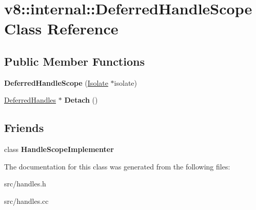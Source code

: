 \hypertarget{classv8_1_1internal_1_1_deferred_handle_scope}{}\section{v8\+:\+:internal\+:\+:Deferred\+Handle\+Scope Class Reference}
\label{classv8_1_1internal_1_1_deferred_handle_scope}
\subsection*{Public Member Functions}
\begin{DoxyCompactItemize}
\item 
\hypertarget{classv8_1_1internal_1_1_deferred_handle_scope_a2a9abeb6fc8fa52bedb8a4de7d8d502a}{}{\bfseries Deferred\+Handle\+Scope} (\hyperlink{classv8_1_1internal_1_1_isolate}{Isolate} $\ast$isolate)\label{classv8_1_1internal_1_1_deferred_handle_scope_a2a9abeb6fc8fa52bedb8a4de7d8d502a}

\item 
\hypertarget{classv8_1_1internal_1_1_deferred_handle_scope_a5aa6f8468dd39ead6bc36caec86db65f}{}\hyperlink{classv8_1_1internal_1_1_deferred_handles}{Deferred\+Handles} $\ast$ {\bfseries Detach} ()\label{classv8_1_1internal_1_1_deferred_handle_scope_a5aa6f8468dd39ead6bc36caec86db65f}

\end{DoxyCompactItemize}
\subsection*{Friends}
\begin{DoxyCompactItemize}
\item 
\hypertarget{classv8_1_1internal_1_1_deferred_handle_scope_a4212b6d1addb496cb92d67a2e399a1f3}{}class {\bfseries Handle\+Scope\+Implementer}\label{classv8_1_1internal_1_1_deferred_handle_scope_a4212b6d1addb496cb92d67a2e399a1f3}

\end{DoxyCompactItemize}


The documentation for this class was generated from the following files\+:\begin{DoxyCompactItemize}
\item 
src/handles.\+h\item 
src/handles.\+cc\end{DoxyCompactItemize}
